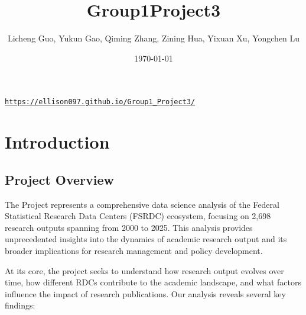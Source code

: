 \documentclass[12pt]{article}
\title{Group1Project3}
\author{Licheng Guo, Yukun Gao, Qiming Zhang, Zining Hua, Yixuan Xu, Yongchen Lu}
\date{\today}
\begin{document}
\maketitle  
\begin{center}
  \href{https://ellison097.github.io/Group1_Project3/}{\texttt{https://ellison097.github.io/Group1\_Project3/}}
\end{center}

\tableofcontents
\newpage

\section{Introduction}

\subsection{Project Overview}
The Project represents a comprehensive data science analysis of the Federal Statistical Research Data Centers (FSRDC) ecosystem, focusing on 2,698 research outputs spanning from 2000 to 2025. This analysis provides unprecedented insights into the dynamics of academic research output and its broader implications for research management and policy development.

At its core, the project seeks to understand how research output evolves over time, how different RDCs contribute to the academic landscape, and what factors influence the impact of research publications. Our analysis reveals several key findings:
\end{document}

